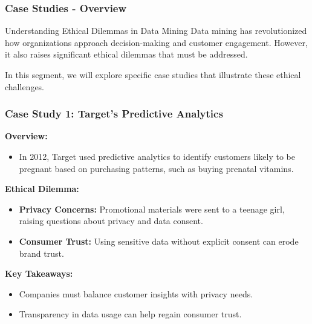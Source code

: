 \documentclass{beamer}
\begin{document}
\begin{frame}[fragile]
    \frametitle{Case Studies - Overview}
    \begin{block}{Understanding Ethical Dilemmas in Data Mining}
        Data mining has revolutionized how organizations approach decision-making and customer engagement. 
        However, it also raises significant ethical dilemmas that must be addressed.
    \end{block}
    In this segment, we will explore specific case studies that illustrate these ethical challenges.
\end{frame}

\begin{frame}[fragile]
    \frametitle{Case Study 1: Target's Predictive Analytics}
    \textbf{Overview:}
    \begin{itemize}
        \item In 2012, Target used predictive analytics to identify customers likely to be pregnant based on purchasing patterns, such as buying prenatal vitamins.
    \end{itemize}
    
    \textbf{Ethical Dilemma:}
    \begin{itemize}
        \item \textbf{Privacy Concerns:} Promotional materials were sent to a teenage girl, raising questions about privacy and data consent.
        \item \textbf{Consumer Trust:} Using sensitive data without explicit consent can erode brand trust.
    \end{itemize}
    
    \textbf{Key Takeaways:}
    \begin{itemize}
        \item Companies must balance customer insights with privacy needs.
        \item Transparency in data usage can help regain consumer trust.
    \end{itemize}
\end{frame}
\end{document}
